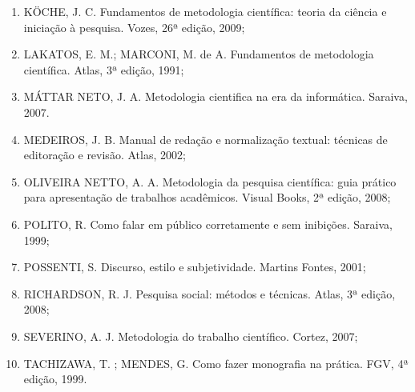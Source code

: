 \begin{itemize}
\begin{enumerate}
    \item KÖCHE, J. C. Fundamentos de metodologia científica: teoria da ciência e iniciação à pesquisa. Vozes, 26ª edição, 2009;

    \item LAKATOS, E. M.; MARCONI, M. de A. Fundamentos de metodologia científica.  Atlas, 3ª edição,  1991;

    \item MÁTTAR NETO, J. A. Metodologia cientifica na era da informática. Saraiva, 2007. 

    \item MEDEIROS, J. B. Manual de redação e normalização textual: técnicas de editoração e revisão. Atlas, 2002;

    \item OLIVEIRA NETTO, A. A. Metodologia da pesquisa científica: guia prático para apresentação de trabalhos acadêmicos. Visual Books, 2ª edição, 2008;

    \item POLITO, R. Como falar em público corretamente e sem inibições.  Saraiva, 1999;

    \item POSSENTI, S. Discurso, estilo e subjetividade. Martins Fontes, 2001;

    \item RICHARDSON, R. J. Pesquisa social: métodos e técnicas. Atlas, 3ª edição, 2008;

    \item SEVERINO, A. J. Metodologia do trabalho científico.  Cortez, 2007;

    \item TACHIZAWA, T. ; MENDES, G. Como fazer monografia na prática.  FGV, 4ª edição, 1999.

	\end{enumerate}

\end{itemize}
